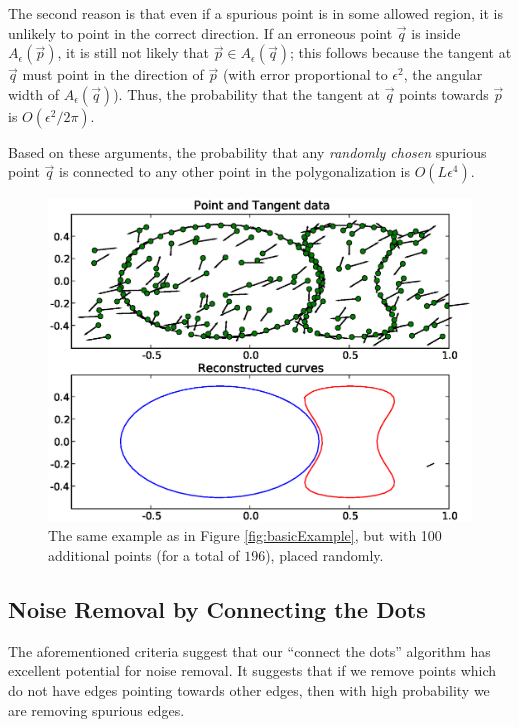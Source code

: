 \documentclass{article}
\numberwithin{cntr}{section}
\numberwithin{equation}{section}
\newcommand{\vp}[0]{{\vec{p}}}
\newcommand{\vq}[0]{{\vec{q}}}
\newcommand{\allowed}[2]{ { A_{#1}(#2) } }
\begin{document}
The second reason is that even if a spurious point is in some allowed region, it is unlikely to point in the correct direction. If an erroneous point $\vq$ is inside $\allowed{\epsilon}{\vp}$, it is still not likely that $\vp \in \allowed{\epsilon}{\vq}$; this follows because the tangent at $\vq$ must point in the direction of $\vp$ (with error proportional to $\epsilon^{2}$, the angular width of $\allowed{\epsilon}{\vq}$). Thus, the probability that the tangent at $\vq$ points towards $\vp$ is $O(\epsilon^{2}/2\pi)$.

Based on these arguments, the probability that any \emph{randomly chosen} spurious point $\vq$ is connected to any other point in the polygonalization is $O(L \epsilon^{4})$.

\begin{figure}
\setlength{\unitlength}{0.240900pt}
\ifx\plotpoint\undefined\newsavebox{\plotpoint}\fi
\sbox{\plotpoint}{\rule[-0.200pt]{0.400pt}{0.400pt}}%
\includegraphics[scale=0.5]{noisy_example.eps}

\caption{The same example as in Figure \ref{fig:basicExample}, but with 100 additional points (for a total of $196$), placed randomly. }
\label{fig:noisyExample}
\end{figure}

\subsection{Noise Removal by Connecting the Dots}

The aforementioned criteria suggest that our ``connect the dots'' algorithm has excellent potential for noise removal. It suggests that if we remove points which do not have edges pointing towards other edges, then with high probability we are removing spurious edges.
\end{document}
